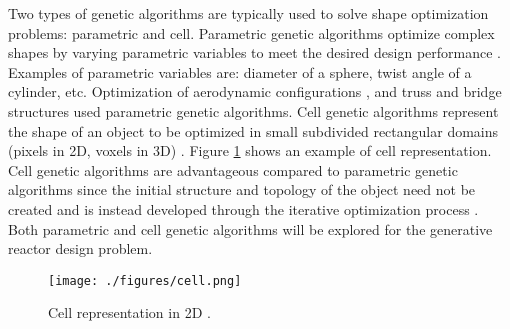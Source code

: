 Two types of genetic algorithms are typically used to solve shape 
optimization problems: parametric and cell. 
Parametric genetic algorithms optimize complex shapes by varying parametric variables
to meet the desired design performance \cite{von_buelow_paragen_2012}.
Examples of parametric variables are: diameter of a sphere, twist angle of a cylinder, 
etc.  
Optimization of aerodynamic configurations \cite{makinen_multidisciplinary_1999}, 
and truss and bridge structures \cite{raich_evolving_2000} used parametric 
genetic algorithms.
Cell genetic algorithms represent the shape of an object to be optimized in 
small subdivided rectangular domains (pixels in 2D, voxels in 3D) 
\cite{renner_genetic_2003}. 
Figure \ref{fig:cell} shows an example of cell representation. 
Cell genetic algorithms are advantageous compared to parametric genetic 
algorithms since the initial structure and topology of the object need not 
be created and is instead developed through the iterative optimization 
process \cite{renner_genetic_2003}. 
Both parametric and cell genetic algorithms will be explored for the generative 
reactor design problem. 

\begin{figure}[!htbp]
	\begin{center}
		\texttt{[image: ./figures/cell.png]}
        \end{center}	
        \caption{Cell representation in 2D \cite{renner_genetic_2003}.}
        \label{fig:cell}
\end{figure}